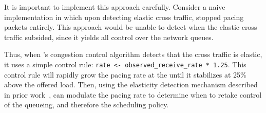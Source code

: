 It is important to implement this approach carefully. 
Consider a naive implementation in which upon detecting elastic cross traffic, \name stopped pacing packets entirely.
This approach would be unable to detect when the elastic cross traffic subsided, since it yields all control over the network queues.

Thus, when \name's congestion control algorithm detects that the cross traffic is elastic, it uses a simple control rule: \texttt{rate <- observed\_receive\_rate * 1.25}. 
This control rule will rapidly grow the pacing rate at the \inbox until it stabilizes at 25\% above the offered load.
Then, using the elasticity detection mechanism described in prior work~\cite{nimbus}, \inbox can modulate the pacing rate to determine when to retake control of the queueing, and therefore the scheduling policy.

 
